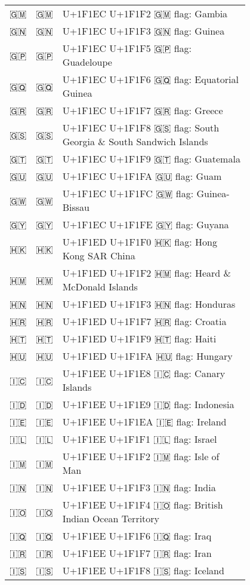 \documentclass[a4paper,12pt]{article}
\newcommand{\fontA}[1]{{\fontspec[RawFeature={mode=harf,+dist,+ccmp}]{Segoe UI Emoji} #1}}
\newcommand{\fontB}[1]{{\fontspec[RawFeature={mode=harf,+dist,+ccmp}]{Noto Color Emoji} #1}}
\begin{document}
\begin{longtable}[c]{ccp{0.8\linewidth}}
\fontA{🇬🇲}&\fontB{🇬🇲}&U+1F1EC U+1F1F2 🇬🇲 flag: Gambia\\
\fontA{🇬🇳}&\fontB{🇬🇳}&U+1F1EC U+1F1F3 🇬🇳 flag: Guinea\\
\fontA{🇬🇵}&\fontB{🇬🇵}&U+1F1EC U+1F1F5 🇬🇵 flag: Guadeloupe\\
\fontA{🇬🇶}&\fontB{🇬🇶}&U+1F1EC U+1F1F6 🇬🇶 flag: Equatorial Guinea\\
\fontA{🇬🇷}&\fontB{🇬🇷}&U+1F1EC U+1F1F7 🇬🇷 flag: Greece\\
\fontA{🇬🇸}&\fontB{🇬🇸}&U+1F1EC U+1F1F8 🇬🇸 flag: South Georgia \& South Sandwich Islands\\
\fontA{🇬🇹}&\fontB{🇬🇹}&U+1F1EC U+1F1F9 🇬🇹 flag: Guatemala\\
\fontA{🇬🇺}&\fontB{🇬🇺}&U+1F1EC U+1F1FA 🇬🇺 flag: Guam\\
\fontA{🇬🇼}&\fontB{🇬🇼}&U+1F1EC U+1F1FC 🇬🇼 flag: Guinea-Bissau\\
\fontA{🇬🇾}&\fontB{🇬🇾}&U+1F1EC U+1F1FE 🇬🇾 flag: Guyana\\
\fontA{🇭🇰}&\fontB{🇭🇰}&U+1F1ED U+1F1F0 🇭🇰 flag: Hong Kong SAR China\\
\fontA{🇭🇲}&\fontB{🇭🇲}&U+1F1ED U+1F1F2 🇭🇲 flag: Heard \& McDonald Islands\\
\fontA{🇭🇳}&\fontB{🇭🇳}&U+1F1ED U+1F1F3 🇭🇳 flag: Honduras\\
\fontA{🇭🇷}&\fontB{🇭🇷}&U+1F1ED U+1F1F7 🇭🇷 flag: Croatia\\
\fontA{🇭🇹}&\fontB{🇭🇹}&U+1F1ED U+1F1F9 🇭🇹 flag: Haiti\\
\fontA{🇭🇺}&\fontB{🇭🇺}&U+1F1ED U+1F1FA 🇭🇺 flag: Hungary\\
\fontA{🇮🇨}&\fontB{🇮🇨}&U+1F1EE U+1F1E8 🇮🇨 flag: Canary Islands\\
\fontA{🇮🇩}&\fontB{🇮🇩}&U+1F1EE U+1F1E9 🇮🇩 flag: Indonesia\\
\fontA{🇮🇪}&\fontB{🇮🇪}&U+1F1EE U+1F1EA 🇮🇪 flag: Ireland\\
\fontA{🇮🇱}&\fontB{🇮🇱}&U+1F1EE U+1F1F1 🇮🇱 flag: Israel\\
\fontA{🇮🇲}&\fontB{🇮🇲}&U+1F1EE U+1F1F2 🇮🇲 flag: Isle of Man\\
\fontA{🇮🇳}&\fontB{🇮🇳}&U+1F1EE U+1F1F3 🇮🇳 flag: India\\
\fontA{🇮🇴}&\fontB{🇮🇴}&U+1F1EE U+1F1F4 🇮🇴 flag: British Indian Ocean Territory\\
\fontA{🇮🇶}&\fontB{🇮🇶}&U+1F1EE U+1F1F6 🇮🇶 flag: Iraq\\
\fontA{🇮🇷}&\fontB{🇮🇷}&U+1F1EE U+1F1F7 🇮🇷 flag: Iran\\
\fontA{🇮🇸}&\fontB{🇮🇸}&U+1F1EE U+1F1F8 🇮🇸 flag: Iceland\\

\end{longtable}
\end{document}
